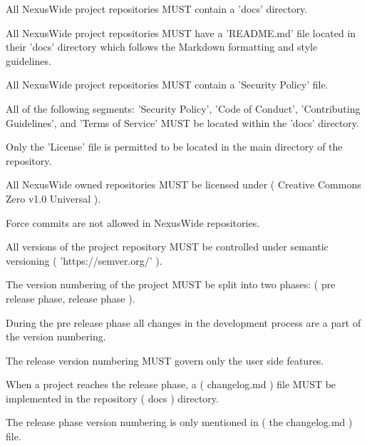 \documentclass[13pt]{scrarticle}
\newcommand{\nexusrule}[1]{\Tribar[1][white][yellow][red]\color{blue} #1}
\begin{document}
      \nexusrule{All NexusWide project repositories MUST contain a 'docs' directory.} \newline

      \nexusrule{All NexusWide project repositories MUST have a 'README.md' file located in their 'docs' directory which follows the Markdown formatting and style guidelines.} \newline

      \nexusrule{All NexusWide project repositories MUST contain a 'Security Policy' file.} \newline

      \nexusrule{All of the following segments: 'Security Policy', 'Code of Conduct', 'Contributing Guidelines', and 'Terms of Service' MUST be located within the 'docs' directory.} \newline

      \nexusrule{Only the 'License' file is permitted to be located in the main directory of the repository.} \newline

      \nexusrule{All NexusWide owned repositories MUST be licensed under ( Creative Commons Zero v1.0 Universal ). } \newline

      \nexusrule{Force commits are not allowed in NexusWide repositories.} \newline

      \nexusrule{All versions of the project repository MUST be controlled under semantic versioning ( 'https://semver.org/' ).} \newline

      \nexusrule{The version numbering of the project MUST be split into two phases: ( pre release phase, release phase ).} \newline

      \nexusrule{ During the pre release phase all changes in the development process are a part of the version numbering.} \newline

      \nexusrule{ The release version numbering MUST govern only the user side features.} \newline

      \nexusrule{ When a project reaches the release phase, a ( changelog.md ) file MUST be implemented in the repository ( docs ) directory.} \newline

      \nexusrule{ The release phase version numbering is only mentioned in ( the changelog.md ) file.} \newline
\end{document}
